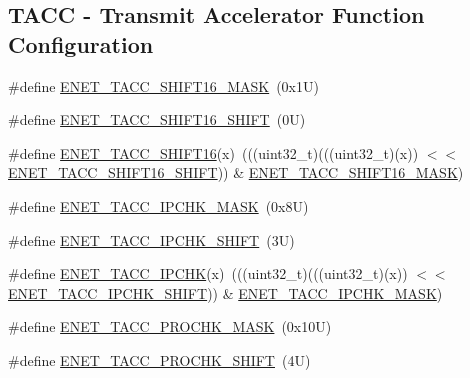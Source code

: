 \subsection*{T\+A\+CC -\/ Transmit Accelerator Function Configuration}
\begin{DoxyCompactItemize}
\item 
\#define \mbox{\hyperlink{group___e_n_e_t___register___masks_ga88e7d546b2d5198aaecb2755eeaca679}{E\+N\+E\+T\+\_\+\+T\+A\+C\+C\+\_\+\+S\+H\+I\+F\+T16\+\_\+\+M\+A\+SK}}~(0x1\+U)
\item 
\#define \mbox{\hyperlink{group___e_n_e_t___register___masks_gad6be72a0d8613b7d2e2a173821caf724}{E\+N\+E\+T\+\_\+\+T\+A\+C\+C\+\_\+\+S\+H\+I\+F\+T16\+\_\+\+S\+H\+I\+FT}}~(0\+U)
\item 
\#define \mbox{\hyperlink{group___e_n_e_t___register___masks_ga10766fc4a1f7bfd05bca5187f5e6aa2d}{E\+N\+E\+T\+\_\+\+T\+A\+C\+C\+\_\+\+S\+H\+I\+F\+T16}}(x)~(((uint32\+\_\+t)(((uint32\+\_\+t)(x)) $<$$<$ \mbox{\hyperlink{group___e_n_e_t___register___masks_gad6be72a0d8613b7d2e2a173821caf724}{E\+N\+E\+T\+\_\+\+T\+A\+C\+C\+\_\+\+S\+H\+I\+F\+T16\+\_\+\+S\+H\+I\+FT}})) \& \mbox{\hyperlink{group___e_n_e_t___register___masks_ga88e7d546b2d5198aaecb2755eeaca679}{E\+N\+E\+T\+\_\+\+T\+A\+C\+C\+\_\+\+S\+H\+I\+F\+T16\+\_\+\+M\+A\+SK}})
\item 
\#define \mbox{\hyperlink{group___e_n_e_t___register___masks_gae79332fd3040e628268621a4525f8ce1}{E\+N\+E\+T\+\_\+\+T\+A\+C\+C\+\_\+\+I\+P\+C\+H\+K\+\_\+\+M\+A\+SK}}~(0x8\+U)
\item 
\#define \mbox{\hyperlink{group___e_n_e_t___register___masks_gaf007c15a11d87397188a6d940575309f}{E\+N\+E\+T\+\_\+\+T\+A\+C\+C\+\_\+\+I\+P\+C\+H\+K\+\_\+\+S\+H\+I\+FT}}~(3\+U)
\item 
\#define \mbox{\hyperlink{group___e_n_e_t___register___masks_gaac7b5a8ff02a50330d14ddb1b74964e1}{E\+N\+E\+T\+\_\+\+T\+A\+C\+C\+\_\+\+I\+P\+C\+HK}}(x)~(((uint32\+\_\+t)(((uint32\+\_\+t)(x)) $<$$<$ \mbox{\hyperlink{group___e_n_e_t___register___masks_gaf007c15a11d87397188a6d940575309f}{E\+N\+E\+T\+\_\+\+T\+A\+C\+C\+\_\+\+I\+P\+C\+H\+K\+\_\+\+S\+H\+I\+FT}})) \& \mbox{\hyperlink{group___e_n_e_t___register___masks_gae79332fd3040e628268621a4525f8ce1}{E\+N\+E\+T\+\_\+\+T\+A\+C\+C\+\_\+\+I\+P\+C\+H\+K\+\_\+\+M\+A\+SK}})
\item 
\#define \mbox{\hyperlink{group___e_n_e_t___register___masks_gad5d647fe5be39e4571d94f84415f4613}{E\+N\+E\+T\+\_\+\+T\+A\+C\+C\+\_\+\+P\+R\+O\+C\+H\+K\+\_\+\+M\+A\+SK}}~(0x10\+U)
\item 
\#define \mbox{\hyperlink{group___e_n_e_t___register___masks_ga1ab45d57f4375fd64bc08ca9cb53341b}{E\+N\+E\+T\+\_\+\+T\+A\+C\+C\+\_\+\+P\+R\+O\+C\+H\+K\+\_\+\+S\+H\+I\+FT}}~(4\+U)

\end{DoxyCompactItemize}
